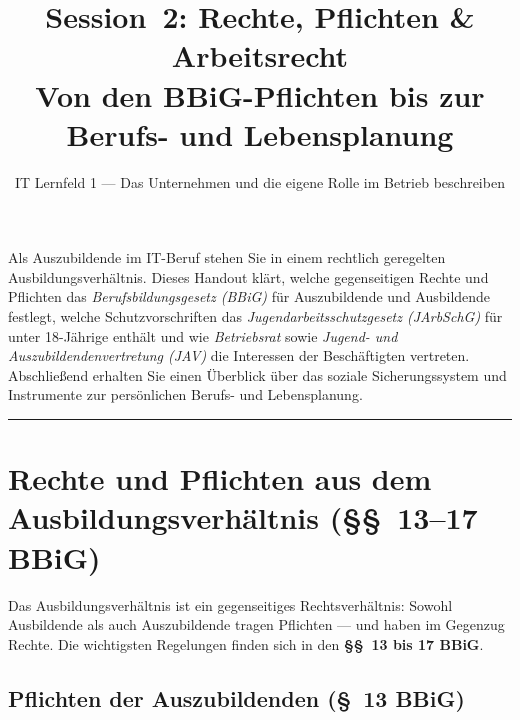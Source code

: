 \documentclass[11pt, a4paper]{article}
\title{\vspace*{-1.5cm}\Huge\bfseries\color{bfwPrimaryDark}Session~2: Rechte, Pflichten \& Arbeitsrecht\\[0.4em]
  \large\color{bfwInkSoft}\textnormal{Von den BBiG-Pflichten bis zur Berufs- und Lebensplanung}}
\author{\textsf{IT Lernfeld 1 --- Das Unternehmen und die eigene Rolle im Betrieb beschreiben}}
\date{}
\begin{document}
\maketitle
\thispagestyle{empty}

\vspace{1em}
\begin{merksatz}[title={\bfseries Worum geht es in dieser Session?}]
Als Auszubildende im IT-Beruf stehen Sie in einem rechtlich geregelten Ausbildungsverhältnis.
Dieses Handout klärt, welche gegenseitigen Rechte und Pflichten das
\emph{Berufsbildungsgesetz (BBiG)} für Auszubildende und Ausbildende festlegt, welche
Schutzvorschriften das \emph{Jugendarbeitsschutzgesetz (JArbSchG)} für unter 18-Jährige
enthält und wie \emph{Betriebsrat} sowie \emph{Jugend- und Auszubildendenvertretung (JAV)}
die Interessen der Beschäftigten vertreten. Abschließend erhalten Sie einen Überblick über
das soziale Sicherungssystem und Instrumente zur persönlichen Berufs- und Lebensplanung.
\end{merksatz}

\tableofcontents
\vspace{1em}
\hrule
\vspace{1em}

\section{Rechte und Pflichten aus dem Ausbildungsverhältnis (§§~13–17 BBiG)}

Das Ausbildungsverhältnis ist ein gegenseitiges Rechtsverhältnis: Sowohl Ausbildende als auch
Auszubildende tragen Pflichten — und haben im Gegenzug Rechte. Die wichtigsten Regelungen
finden sich in den \textbf{§§~13 bis 17 BBiG}.

\subsection{Pflichten der Auszubildenden (§~13 BBiG)}
\end{document}
